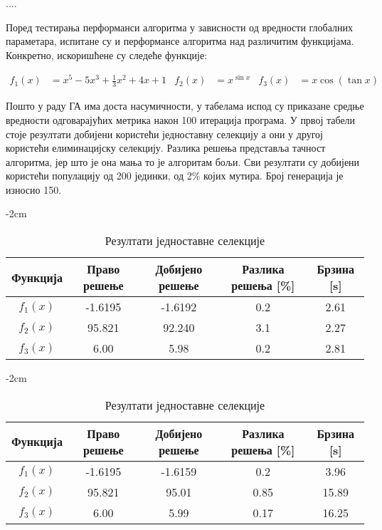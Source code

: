\documentclass{article}
\begin{document}
....

Поред тестирања перформанси алгоритма у зависности од вредности глобалних параметара, испитане
су и перформансе алгоритма над различитим функцијама. Конкретно, искоришћене су следеће функције: 

\begin{align*}
    f_1(x) &= x^5 - 5x^3 + \frac{1}{3} x^2 + 4x + 1 & f_2(x) &= x ^ {\sin x} & f_3(x) &= x \cos(\tan x)
\end{align*}

Пошто у раду ГА има доста насумичности, у табелама испод су приказане средње вредности одговарајућих
метрика након 100 итерација програма. У првој табели стоје резултати добијени користећи
једноставну селекцију а они у другој користећи елиминацијску селекцију. Разлика решења представља 
тачност алгоритма, јер што је она мања то је алгоритам бољи. Сви резултати су добијени користећи 
популацију од 200 јединки, од 2\% којих мутира. Број генерација је износио 150.

\begin{table}[H]
    \centering
    \addtolength{\leftskip} {-2cm}
    \addtolength{\rightskip}{-2cm}
    \begin{tabular}{ |c|c|c|c|c| } 
        \hline
        \textbf{Функција} & \textbf{Право решење} & \textbf{Добијено решење} & \textbf{Разлика решења [\%]} & \textbf{Брзина [s]} \\ 
        \hline
        $f_1(x)$ & -1.6195 & -1.6192 & 0.2 & 2.61 \\ 
        \hline                     
        $f_2(x)$ & 95.821 & 92.240 & 3.1 & 2.27 \\ 
        \hline                     
        $f_3(x)$ & 6.00 & 5.98 & 0.2 & 2.81 \\ 
        \hline                     
    \end{tabular}
    \caption{Резултати једноставне селекције}
\end{table}

\begin{table}[H]
    \centering
    \addtolength{\leftskip} {-2cm}
    \addtolength{\rightskip}{-2cm}
    \begin{tabular}{ |c|c|c|c|c| } 
        \hline
        \textbf{Функција} & \textbf{Право решење} & \textbf{Добијено решење} & \textbf{Разлика решења [\%]} & \textbf{Брзина [s]} \\ 
        \hline
        $f_1(x)$ & -1.6195 & -1.6159 & 0.2 & 3.96 \\ 
        \hline                     
        $f_2(x)$ & 95.821 & 95.01 & 0.85 & 15.89 \\ 
        \hline                     
        $f_3(x)$ & 6.00 & 5.99 & 0.17 & 16.25 \\ 
        \hline                     
    \end{tabular}
    \caption{Резултати једноставне селекције}
\end{table}
\end{document}
